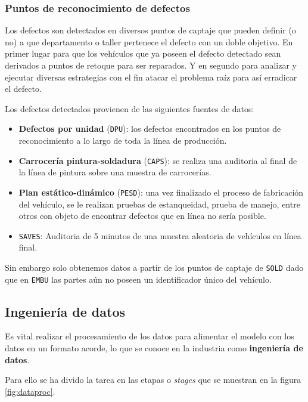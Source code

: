 \documentclass[a4paper,12pt]{article}
\begin{document}
		\subsubsection{Puntos de reconocimiento de defectos} \label{ptocptj}
		Los defectos son detectados en diversos puntos de captaje que pueden definir (o no) a que departamento o taller pertenece el defecto con un doble objetivo. En primer lugar para que los vehículos que ya poseen el defecto detectado sean derivados a puntos de retoque para ser reparados. Y en segundo para analizar y ejecutar diversas estrategias con el fin atacar el problema raíz para así erradicar el defecto.
				
		\clearpage				
				
		Los defectos detectados provienen de las siguientes fuentes de datos:
		\begin{itemize}[noitemsep, topsep=2pt]
			\item \textbf{Defectos por unidad} (\texttt{DPU}): los defectos encontrados en los puntos de reconocimiento a lo largo de toda la línea de producción.
			\item \textbf{Carrocería pintura-soldadura} (\texttt{CAPS}): se realiza una auditoria al final de la línea de pintura sobre una muestra de carrocerías.
			\item \textbf{Plan estático-dinámico} (\texttt{PESD}): una vez finalizado el proceso de fabricación del vehículo, se le realizan pruebas de estanqueidad, prueba de manejo, entre otros con objeto de encontrar defectos que en línea no sería posible.
			\item \texttt{SAVES}: Auditoria de 5 minutos de una muestra aleatoria de vehículos en línea final.
		\end{itemize}
				
		Sin embargo solo obtenemos datos a partir de los puntos de captaje de \texttt{SOLD} dado que en \texttt{EMBU} las partes aún no poseen un identificador único del vehículo.
				
		\subsection{Ingeniería de datos}
		Es vital realizar el procesamiento de los datos para alimentar el modelo con los datos en un formato acorde, lo que se conoce en la industria como \textbf{ingeniería de datos}.
				
		Para ello se ha divido la tarea en las etapas o \textit{stages} que se muestran en la figura \ref{fig:dataproc}.
				
\end{document}
